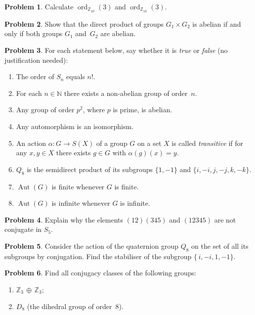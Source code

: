 \documentclass[10pt]{article}
\theoremstyle{definition} %
\newtheorem{problem}{Problem}
\theoremstyle{plain} %
\begin{document}
\begin{problem}
  Calculate $\operatorname{ord}_{\mathbb{Z}_{10}}\!(3)$ and $\operatorname{ord}_{\mathbb{Z}_{16}}\!(3)$.
\end{problem}

\begin{problem}
  Show that the direct product of groups $G_{1}\times G_{2}$ is abelian if and only if both groups $G_{1}$ and $G_{2}$ are abelian.
\end{problem}
\begin{problem}
  For each statement below, say whether it is \textit{true} or \textit{false} (no justification needed):
  \begin{enumerate}[label=(\alph*)]
      \item The order of $S_{n}$ equals $n!$.
      \item For each $n\in\mathbb{N}$ there exists a non‑abelian group of order $n$.
      \item Any group of order $p^{2}$, where $p$ is prime, is abelian.
      \item Any automorphism is an isomorphism.
      \item An action $\alpha:G\to S(X)$ of a group $G$ on a set $X$ is called \emph{transitive} if for any $x,y\in X$ there exists $g\in G$ with $\alpha(g)(x)=y$.
      \item $Q_{8}$ is the semidirect product of its subgroups $\{1,-1\}$ and $\{i,-i,j,-j,k,-k\}$.
      \item $\operatorname{Aut}(G)$ is finite whenever $G$ is finite.
      \item $\operatorname{Aut}(G)$ is infinite whenever $G$ is infinite.
  \end{enumerate}
\end{problem}

\begin{problem}
  Explain why the elements $(12)(345)$ and $(12345)$ are not conjugate in $S_{5}$.
\end{problem}

\begin{problem}
  Consider the action of the quaternion group $Q_{8}$ on the set of all its subgroups by conjugation.  
  Find the stabiliser of the subgroup $\{\,i,-i,1,-1\}$.
\end{problem}

\begin{problem}
  Find all conjugacy classes of the following groups:
  \begin{enumerate}[label=(\alph*)]
      \item $\mathbb{Z}_{3}\,\oplus\,\mathbb{Z}_{3}$;
      \item $D_{8}$ (the dihedral group of order $8$).
  \end{enumerate}
\end{problem}
\end{document}
